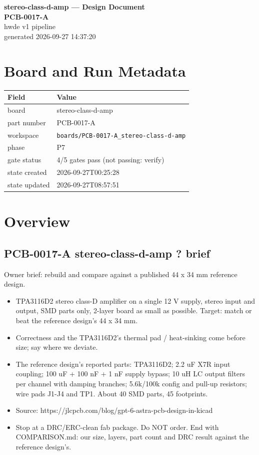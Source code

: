 \documentclass[11pt,a4paper]{article}
\begin{document}
\sloppy
\begin{center}
{\LARGE\bfseries stereo-class-d-amp --- Design Document}\\[6pt]
{\Large\bfseries PCB-0017-A}\\[6pt]
{\large hwde v1 pipeline}\\[2pt]
generated 2026-09-27 14:37:20
\end{center}
\tableofcontents

\section{Board and Run Metadata}
{\small
\begin{longtable}{lp{11cm}}
\toprule
\textbf{Field} & \textbf{Value} \\
\midrule
\endhead
board & stereo-class-d-amp \\
part number & PCB-0017-A \\
workspace & \texttt{boards/PCB-0017-A\_stereo-class-d-amp} \\
phase & P7 \\
gate status & 4/5 gates pass (not passing: verify) \\
state created & 2026-09-27T00:25:28 \\
state updated & 2026-09-27T08:57:51 \\
\bottomrule
\end{longtable}
}
\section{Overview}
\subsection*{PCB-0017-A stereo-class-d-amp ? brief}
Owner brief: rebuild and compare against a published 44 x 34 mm reference design.

\begin{itemize}
\item TPA3116D2 stereo class-D amplifier on a single 12 V supply, stereo input and output, SMD parts only,
2-layer board as small as possible. Target: match or beat the reference design's 44 x 34 mm.
\item Correctness and the TPA3116D2's thermal pad / heat-sinking come before size; say where we deviate.
\item The reference design's reported parts: TPA3116D2; 2.2 uF X7R input coupling; 100 uF + 100 nF + 1 nF supply bypass;
10 uH LC output filters per channel with damping branches; 5.6k/100k config and pull-up resistors;
wire pads J1-J4 and TP1. About 40 SMD parts, 45 footprints.
\item Source: https://jlcpcb.com/blog/gpt-6-astra-pcb-design-in-kicad
\item Stop at a DRC/ERC-clean fab package. Do NOT order. End with COMPARISON.md: our size, layers,
part count and DRC result against the reference design's.
\end{itemize}
\end{document}
